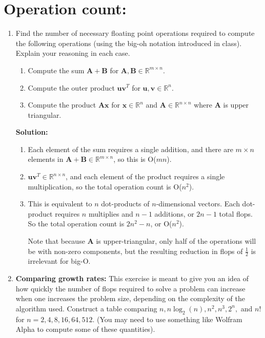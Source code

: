 \documentclass[]{article}
\newcommand{\half}{\frac{1}{2}}			%
\newcommand{\R}{\mathbb{R}}				%
\newcommand{\x}{\bm{x}}					%
\newcommand{\A}{\bm{A}}					%
\newcommand{\solution}{\vskip 0.5cm \textbf{\large Solution:} \\}
\begin{document}
    \section*{Operation count:}
    \begin{enumerate}[resume]
	\item Find the number of necessary floating point operations required to compute the following operations (using the big-oh notation introduced in class). Explain your reasoning in each case.
	  \begin{enumerate}
	  \item Compute the sum $\A+\bm{B}$ for $\A,\bm{B}\in\R^{m\times n}$.
	  \item Compute the outer product $\bm{uv}^T$ for $\bm{u},\bm{v}\in\R^n$.
	  \item Compute the product $\A\x$ for $\x\in\R^n$ and $\A\in\R^{n\times n}$ where $\A$ is upper triangular.
	  \end{enumerate}

	  \solution
	  \begin{enumerate}
	  \item
        Each element of the sum requires a single addition, and there
        are $m \times n$ elements in $\A + \bm{B} \in \R^{m \times n}$, so
        this is O($mn$).

      \item $\bm{uv}^T \in \R^{n \times n}$, and each element of the
        product requires a single multiplication, so the total
        operation count is O($n^2$).

      \item This is equivalent to $n$ dot-products of $n$-dimensional
        vectors. Each dot-product requires $n$ multiplies and $n-1$
        additions, or $2n - 1$ total flops. So the total operation
        count is $2n^2 - n$, or O($n^2$).

        Note that because $\A$ is upper-triangular, only half of the
        operations will be with non-zero components, but the resulting
        reduction in flops of $\half$ is irrelevant for big-O.
	  \end{enumerate}


	\item \textbf{Comparing growth rates:} This exercise is meant to
      give you an idea of how quickly the number of flops required to
      solve a problem can increase when one increases the problem
      size, depending on the complexity of the algorithm
      used. Construct a table comparing $n,n\log_2(n),n^2,n^3,2^n,$
      and $n!$ for $n=2,4,8,16,64,512$. (You may need to use something
      like Wolfram Alpha to compute some of these quantities).


\end{enumerate}
\end{document}
